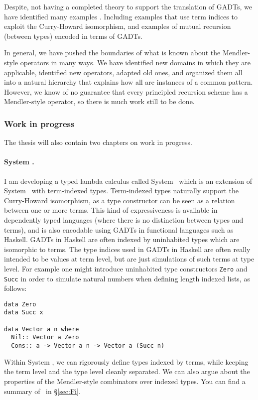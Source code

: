 Despite, not having a completed theory to support the translation of GADTs,
we have identified many examples \cite{AhnShe11}. Including examples
that use term indices to exploit the Curry-Howard isomorphism, and
examples of mutual recursion (between types) encoded in terms of GADTs.

In general, we have pushed the boundaries of what is known about
the Mendler-style operators in many ways. We have identified new domains
in which they are applicable, identified new operators, adapted old ones,
and organized them all into a natural hierarchy that explains how all are
instances of a common pattern. However, we know of no guarantee that every
principled recursion scheme has a Mendler-style operator, so there is
much work still to be done.


\subsubsection{Work in progress} \label{Fi}

The thesis will also contain two chapters on work in progress.

\paragraph{System \Fi.}
I am developing a typed lambda calculus called System \Fi\, which is an
extension of System \Fw\ with term-indexed types. Term-indexed types
naturally support the Curry-Howard isomorphism, as a type constructor can be
seen as a relation between one or more terms.  This kind of expressiveness is
available in dependently typed languages (where there is no distinction between
types and terms), and is also encodable using GADTs in functional languages
such as Haskell.  GADTs in Haskell are often indexed by uninhabited types
which are isomorphic to terms. The type indices used in GADTs in Haskell are
often really intended to be values at term level, but are just simulations of
such terms at type level.  For example one might introduce uninhabited type
constructors \verb+Zero+ and \verb+Succ+ in order to simulate natural numbers
when defining length indexed lists, as follows:
\begin{verbatim}
data Zero
data Succ x

data Vector a n where
  Nil:: Vector a Zero
  Cons:: a -> Vector a n -> Vector a (Succ n)
\end{verbatim}  

Within System \Fi, we can rigorously define types indexed by terms,
while keeping the term level and the type level cleanly separated.
We can also argue about the properties of the Mendler-style combinators
over indexed types.  You can find a summary of \Fi\ in \S\ref{sec:Fi}.

